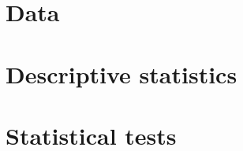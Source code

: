 \newpage
\begin{appendices}


\section{Data}



\section{Descriptive statistics}





\section{Statistical tests}

\end{appendices}